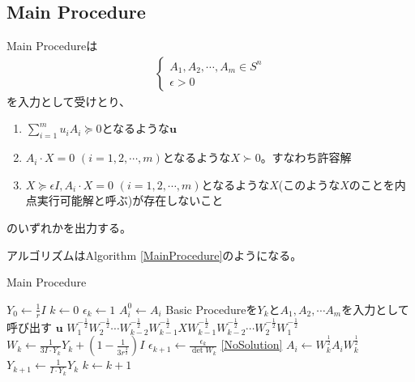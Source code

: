 \subsection{Main Procedure}
Main Procedureは
\begin{align*}
  \left\{
    \begin{array}{l}
      A_1, A_2, \cdots, A_m \in S^n \\
      \epsilon > 0
    \end{array}
  \right.
\end{align*}
を入力として受けとり、
\begin{enumerate}[label=(\alph*)]
  \item $\displaystyle{\sum_{i = 1}^m u_i A_i \succeq 0}$となるような$\mathbf{u}$ \label{DualSolution}
  \item $A_i \cdot X = 0 \,\, (i = 1, 2, \cdots, m)$となるような$X \succ 0$。すなわち許容解 \label{FeasibleSolution}
  \item $X \succeq \epsilon I, A_i \cdot X = 0 \,\, (i = 1, 2, \cdots, m)$となるような$X$(このような$X$のことを内点実行可能解と呼ぶ)が存在しないこと \label{NoSolution}
\end{enumerate}
のいずれかを出力する。

アルゴリズムはAlgorithm \ref{MainProcedure}のようになる。
\begin{algorithm}
  \caption{Main Procedure}
  \label{MainProcedure}
  \begin{algorithmic}[1]
    \State $\displaystyle{Y_0 \leftarrow \frac{1}{r} I}$
    \State $k \leftarrow 0$
    \State $\epsilon_k \leftarrow 1$
      \State $A_i^0 \leftarrow A_i$
    \EndFor
    \State Basic Procedureを$Y_k$と$A_1, A_2, \cdots A_m$を入力として呼び出す \label{CallBasicProcedure}
      \State \Return $\mathbf{u}$
      \State \Return $\displaystyle{W_1^{-\frac{1}{2}} W_2^{-\frac{1}{2}} \cdots W_{k - 2}^{-\frac{1}{2}} W_{k - 1}^{-\frac{1}{2}} X W_{k - 1}^{-\frac{1}{2}} W_{k - 2}^{-\frac{1}{2}} \cdots W_2^{-\frac{1}{2}} W_1^{-\frac{1}{2}}}$
    \EndIf
    \State $\displaystyle{W_k \leftarrow \frac{1}{3 I \cdot Y_k} Y_k + (1 - \frac{1}{3 r^\frac{3}{2}}) I}$
    \State $\displaystyle{\epsilon_{k + 1} \leftarrow \frac{\epsilon_k}{\det W_k}}$
      \State \Return \ref{NoSolution}
    \EndIf
      \State $\displaystyle{A_i \leftarrow W_k^\frac{1}{2} A_i W_k^\frac{1}{2}}$
    \EndFor
    \State $\displaystyle{Y_{k + 1} \leftarrow \frac{1}{I \cdot Y_k} Y_k}$
    \State $k \leftarrow k + 1$
    \State {}
  \end{algorithmic}
\end{algorithm}
